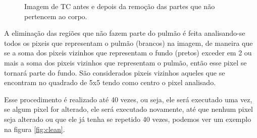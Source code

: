 \begin{figure}[ht]
 \begin{center}
 \end{center}
 \caption{Imagem de TC antes e depois da remoção das partes que não pertencem ao corpo.}
 \label{fig:remocao}
\end{figure}

A eliminação das regiões que não fazem parte do pulmão é feita analisando-se todos os pixeis que representam o pulmão (brancos) na imagem, de maneira que se a soma dos pixeis vizinhos que representam o fundo (pretos) exceder em 2 ou mais a soma dos pixeis vizinhos que representam o pulmão, então esse pixel se tornará parte do fundo. São considerados pixeis vizinhos aqueles que se encontram no quadrado de 5x5 tendo como centro o pixel analisado.

Esse procedimento é realizado até 40 vezes, ou seja, ele será executado uma vez, se algum pixel for alterado, ele será executado novamente, até que nenhum pixel seja alterado ou que ele já tenha se repetido 40 vezes, podemos ver um exemplo na figura \ref{fig:clean}.

